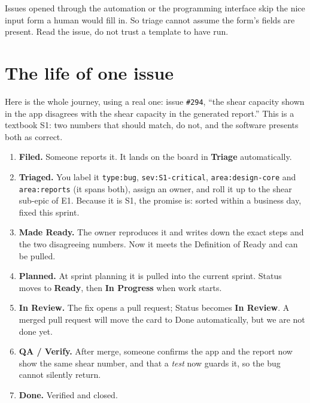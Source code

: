 \documentclass[11pt,a4paper]{report}
\newcommand{\code}[1]{\texttt{#1}}
\begin{document}
\begin{notebox}
Issues opened through the automation or the programming interface skip the nice
input form a human would fill in. So triage cannot assume the form's fields are
present. Read the issue, do not trust a template to have run.
\end{notebox}

\chapter{The life of one issue}

Here is the whole journey, using a real one: issue \code{\#294}, ``the shear capacity
shown in the app disagrees with the shear capacity in the generated report.'' This is
a textbook S1: two numbers that should match, do not, and the software presents both
as correct.

\begin{enumerate}[leftmargin=1.7em,itemsep=5pt]
  \item \textbf{Filed.} Someone reports it. It lands on the board in \textbf{Triage}
        automatically.
  \item \textbf{Triaged.} You label it \code{type:bug}, \code{sev:S1-critical},
        \code{area:design-core} and \code{area:reports} (it spans both), assign an
        owner, and roll it up to the shear sub-epic of E1. Because it is S1, the
        promise is: sorted within a business day, fixed this sprint.
  \item \textbf{Made Ready.} The owner reproduces it and writes down the exact steps
        and the two disagreeing numbers. Now it meets the Definition of Ready and can
        be pulled.
  \item \textbf{Planned.} At sprint planning it is pulled into the current sprint.
        Status moves to \textbf{Ready}, then \textbf{In Progress} when work starts.
  \item \textbf{In Review.} The fix opens a pull request; Status becomes \textbf{In
        Review}. A merged pull request will move the card to Done automatically, but
        we are not done yet.
  \item \textbf{QA / Verify.} After merge, someone confirms the app and the report
        now show the same shear number, and that a \emph{test} now guards it, so the
        bug cannot silently return.
  \item \textbf{Done.} Verified and closed.
\end{enumerate}
\end{document}
